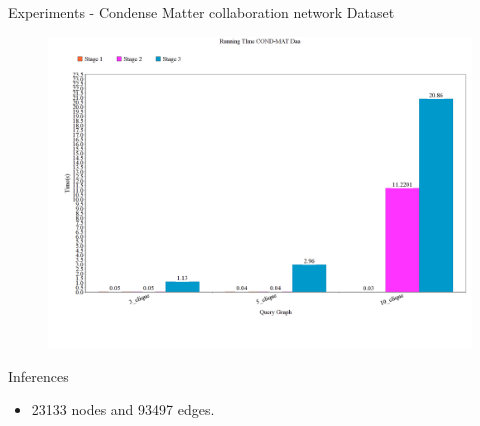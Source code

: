 \documentclass{beamer}
\begin{document}
\begin{frame}{Experiments - Condense Matter collaboration network Dataset}
\begin{figure}[h]
 \centering
\includegraphics[width=.5\textwidth]{CA.png}

 \label{fig:dchange}
\end{figure}
\begin{block}{Inferences}
    \begin{itemize}
    \item 23133 nodes and 93497 edges.
    \end{itemize}
\end{block}
\end{frame}
%    
\end{document}
